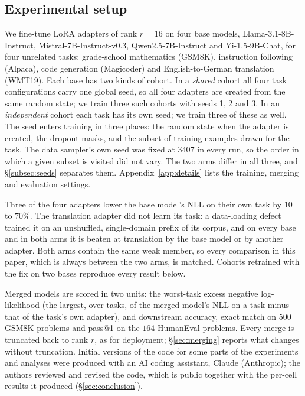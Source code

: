 \subsection{Experimental setup}\label{subsec:setup}

We fine-tune LoRA adapters of rank $r = 16$ on four base models,
Llama-3.1-8B-Instruct, Mistral-7B-Instruct-v0.3, Qwen2.5-7B-Instruct and
Yi-1.5-9B-Chat,
for four unrelated tasks: grade-school mathematics (GSM8K), instruction
following (Alpaca), code generation (Magicoder) and English-to-German
translation (WMT19). Each base has two kinds of cohort. In a \emph{shared}
cohort all four task configurations carry one global seed, so all four
adapters are created from the same random state; we train three such cohorts
with seeds 1, 2 and 3. In an \emph{independent} cohort each task has its own
seed; we train three of these as well. The seed enters training in three
places: the random state when the adapter is created, the dropout masks, and
the subset of training examples drawn for the task. The data sampler's own
seed was fixed at $3407$ in every run, so the order in which a given subset is
visited did not vary. The two arms differ in all three, and
\S\ref{subsec:seeds} separates them. Appendix~\ref{app:details} lists the
training, merging and evaluation settings.

Three of the four adapters lower the base model's NLL on their own task by
$10$ to $70\%$. The translation adapter did not learn its task: a data-loading defect
trained it on
an unshuffled, single-domain prefix of its corpus, and on every base and in
both arms it is beaten at translation by the base model or by another adapter. Both arms
contain the same weak member, so every comparison in this paper, which is
always between the two arms, is matched. Cohorts retrained with the fix on two
bases reproduce every result below.

Merged models are scored in two units: the worst-task excess negative
log-likelihood (the largest, over tasks, of the merged model's NLL on a task
minus that of the task's own adapter), and downstream accuracy, exact match on
$500$ GSM8K problems and pass@1 on the $164$ HumanEval problems. Every merge is
truncated back to rank $r$, as for deployment; \S\ref{sec:merging} reports
what changes without truncation. Initial versions of the code for some
parts of the experiments and analyses were produced with an AI coding
assistant, Claude (Anthropic); the authors reviewed and revised the code, which
is public together with the per-cell results it produced
(\S\ref{sec:conclusion}).

